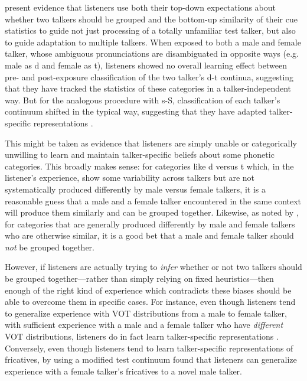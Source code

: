  present evidence that listeners use both their top-down expectations about whether two talkers should be grouped and the bottom-up similarity of their cue statistics to guide not just processing of a totally unfamiliar test talker, but also to guide adaptation to multiple talkers.  When exposed to both a male and female talker, whose ambiguous pronunciations are disambiguated in opposite ways (e.g. male as \ph d and female as \ph t), listeners showed no overall learning effect between pre- and post-exposure classification of the two talker's \ph d-\ph t continua, suggesting that they have tracked the statistics of these categories in a talker-independent way.  But for the analogous procedure with \ph s-\ph S, classification of each talker's continuum shifted in the typical way, suggesting that they have adapted talker-specific representations \cite{Kraljic2007}.  

This might be taken as evidence that listeners are simply unable or categorically unwilling to learn and maintain talker-specific beliefs about some phonetic categories.  This broadly makes sense: for categories like \ph d versus \ph t which, in the listener's experience, show some variability across talkers but are not systematically produced differently by male versus female talkers, it is a reasonable guess that a male and a female talker encountered in the same context will produce them similarly and can be grouped together.  Likewise, as noted by , for categories that are generally produced differently by male and female talkers who are otherwise similar, it is a good bet that a male and female talker should \emph{not} be grouped together.

However, if listeners are actually trying to \emph{infer} whether or not two talkers should be grouped together---rather than simply relying on fixed heuristics---then enough of the right kind of experience which contradicts these biases should be able to overcome them in specific cases.  For instance, even though listeners tend to generalize experience with VOT distributions from a male to female talker, with sufficient experience with a male and a female talker who have \emph{different} VOT distributions, listeners do in fact learn talker-specific representations \cite{Munson2011}.  Conversely, even though listeners tend to learn talker-specific representations of fricatives, by using a modified test continuum  found that listeners can generalize experience with a female talker's fricatives to a novel male talker.
\label{r1-reinisch1}

